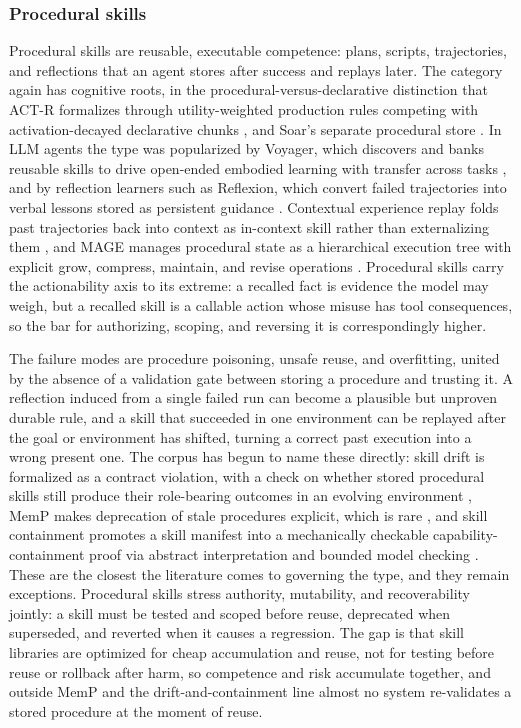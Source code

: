 \subsubsection{Procedural skills}

Procedural skills are reusable, executable competence: plans, scripts, trajectories, and reflections that an agent stores after success and replays later. The category again has cognitive roots, in the procedural-versus-declarative distinction that ACT-R formalizes through utility-weighted production rules competing with activation-decayed declarative chunks \citep{anderson2004actr}, and Soar's separate procedural store \citep{laird2012soar}. In LLM agents the type was popularized by Voyager, which discovers and banks reusable skills to drive open-ended embodied learning with transfer across tasks \citep{wang2023voyageropenendedembodiedagent}, and by reflection learners such as Reflexion, which convert failed trajectories into verbal lessons stored as persistent guidance \citep{shinn2023reflexionlanguageagentsverbal}. Contextual experience replay folds past trajectories back into context as in-context skill rather than externalizing them \citep{liu2025contextualexperiencereplay}, and MAGE manages procedural state as a hierarchical execution tree with explicit grow, compress, maintain, and revise operations \citep{chen2026mage}. Procedural skills carry the actionability axis to its extreme: a recalled fact is evidence the model may weigh, but a recalled skill is a callable action whose misuse has tool consequences, so the bar for authorizing, scoping, and reversing it is correspondingly higher.

The failure modes are procedure poisoning, unsafe reuse, and overfitting, united by the absence of a validation gate between storing a procedure and trusting it. A reflection induced from a single failed run can become a plausible but unproven durable rule, and a skill that succeeded in one environment can be replayed after the goal or environment has shifted, turning a correct past execution into a wrong present one. The corpus has begun to name these directly: skill drift is formalized as a contract violation, with a check on whether stored procedural skills still produce their role-bearing outcomes in an evolving environment \citep{fan2026skilldriftcontract}, MemP makes deprecation of stale procedures explicit, which is rare \citep{fang2026mempexploringagentprocedural}, and skill containment promotes a skill manifest into a mechanically checkable capability-containment proof via abstract interpretation and bounded model checking \citep{metere2026skillcontainment}. These are the closest the literature comes to governing the type, and they remain exceptions. Procedural skills stress authority, mutability, and recoverability jointly: a skill must be tested and scoped before reuse, deprecated when superseded, and reverted when it causes a regression. The gap is that skill libraries are optimized for cheap accumulation and reuse, not for testing before reuse or rollback after harm, so competence and risk accumulate together, and outside MemP and the drift-and-containment line almost no system re-validates a stored procedure at the moment of reuse.

